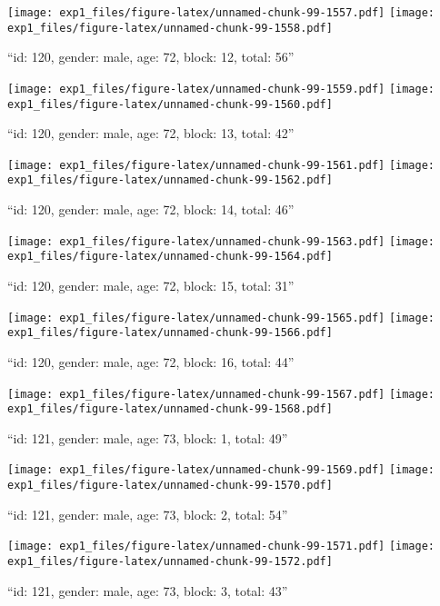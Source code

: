 \documentclass[,]{article}
\begin{document}
\texttt{[image: exp1\_files/figure-latex/unnamed-chunk-99-1557.pdf]}
\texttt{[image: exp1\_files/figure-latex/unnamed-chunk-99-1558.pdf]}

\newpage
[1] 

``id: 120, gender: male, age: 72, block: 12, total: 56''

\texttt{[image: exp1\_files/figure-latex/unnamed-chunk-99-1559.pdf]}
\texttt{[image: exp1\_files/figure-latex/unnamed-chunk-99-1560.pdf]}

\newpage
[1] 

``id: 120, gender: male, age: 72, block: 13, total: 42''

\texttt{[image: exp1\_files/figure-latex/unnamed-chunk-99-1561.pdf]}
\texttt{[image: exp1\_files/figure-latex/unnamed-chunk-99-1562.pdf]}

\newpage
[1] 

``id: 120, gender: male, age: 72, block: 14, total: 46''

\texttt{[image: exp1\_files/figure-latex/unnamed-chunk-99-1563.pdf]}
\texttt{[image: exp1\_files/figure-latex/unnamed-chunk-99-1564.pdf]}

\newpage
[1] 

``id: 120, gender: male, age: 72, block: 15, total: 31''

\texttt{[image: exp1\_files/figure-latex/unnamed-chunk-99-1565.pdf]}
\texttt{[image: exp1\_files/figure-latex/unnamed-chunk-99-1566.pdf]}

\newpage
[1] 

``id: 120, gender: male, age: 72, block: 16, total: 44''

\texttt{[image: exp1\_files/figure-latex/unnamed-chunk-99-1567.pdf]}
\texttt{[image: exp1\_files/figure-latex/unnamed-chunk-99-1568.pdf]}

\newpage
[1] 

``id: 121, gender: male, age: 73, block: 1, total: 49''

\texttt{[image: exp1\_files/figure-latex/unnamed-chunk-99-1569.pdf]}
\texttt{[image: exp1\_files/figure-latex/unnamed-chunk-99-1570.pdf]}

\newpage
[1] 

``id: 121, gender: male, age: 73, block: 2, total: 54''

\texttt{[image: exp1\_files/figure-latex/unnamed-chunk-99-1571.pdf]}
\texttt{[image: exp1\_files/figure-latex/unnamed-chunk-99-1572.pdf]}

\newpage
[1] 

``id: 121, gender: male, age: 73, block: 3, total: 43''
\end{document}
